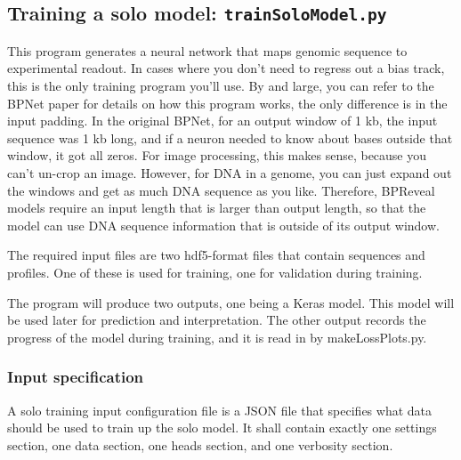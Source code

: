 \documentclass{article}
\begin{document}
\newpage


\subsection{Training a solo model: \texttt{trainSoloModel.py}}

This program generates a neural network that maps genomic sequence to experimental readout.
In cases where you don't need to regress out a bias track, this is the only training program you'll use.
By and large, you can refer to the BPNet paper for details on how this program works, the only difference is in the input padding.
In the original BPNet, for an output window of 1 kb, the input sequence was 1 kb long, and if a neuron needed to know about bases outside that window, it got all zeros.
For image processing, this makes sense, because you can't un-crop an image. However, for DNA in a genome, you can just expand out the windows and get as much DNA sequence as you like.
Therefore, BPReveal models require an input length that is larger than output length, so that the model can use DNA sequence information that is outside of its output window.

The required input files are two hdf5-format files that contain sequences and profiles. One of these is used for training, one for validation during training.

The program will produce two outputs, one being a Keras model. This model will be used later for prediction and interpretation. 
The other output records the progress of the model during training, and it is read in by makeLossPlots.py.


\subsubsection{Input specification}

A solo training input configuration file is a JSON file that specifies what data should be used to train up the solo model.
It shall contain exactly one settings section, one data section, one heads section, and one verbosity section.
\end{document}
